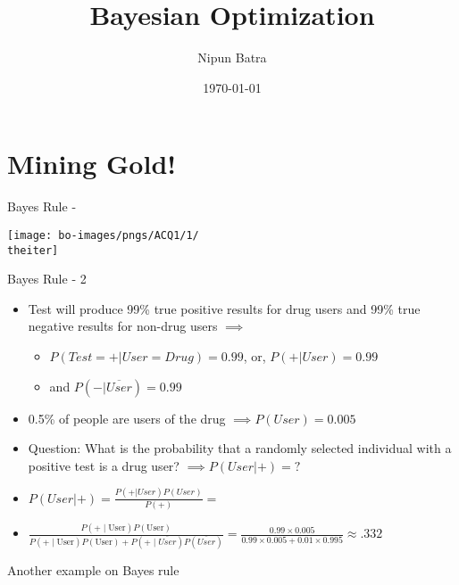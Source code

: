 \documentclass{beamer}
\title{Bayesian Optimization}
\date{\today}
\author{Nipun Batra}
\institute{IIT Gandhinagar}
\begin{document}
  \maketitle
  
  
\section{Mining Gold!}
%
{%
	\begin{frame}{Bayes Rule - \theiter}
		\begin{center}
			\texttt{[image: bo-images/pngs/ACQ1/1/\\theiter]}
		\end{center}
	\end{frame}
}

\begin{frame}{Bayes Rule - 2}
\begin{itemize}
	
\item Test will produce 99\% true positive results for drug users and 99\% true negative results for non-drug users $\implies$
\begin{itemize}
	\item $P(Test=+|User=Drug) = 0.99$, or, $P(+|User) = 0.99$
	\item and $P(-|\overline{User}) =0.99$ 
\end{itemize}  
		\item 0.5\% of people are users of the drug $\implies P(User) = 0.005$
		\item Question: What is the probability that a randomly selected individual with a positive test is a drug user? $\implies P(User|+) = ?$
		\item 
				$P(User|+) = \frac{P(+|User)P(User)}{P(+)} = $
		\item $\frac{P(\text{+}\mid\text{User}) P(\text{User})}{P(\text{+}\mid\text{User}) P(\text{User}) + P(\text{+}\mid\overline{User}) P(\overline{User})} = \frac{0.99\times 0.005}{0.99\times 0.005 + 0.01\times0.995} \approx .332$ 
	
\end{itemize}
\end{frame}

\begin{frame}{Another example on Bayes rule}
\end{frame}
\end{document}
